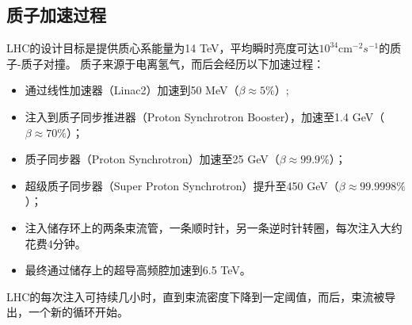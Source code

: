 \subsection{质子加速过程}
LHC的设计目标是提供质心系能量为14 TeV，平均瞬时亮度可达$10^{34} \text{cm}^{-2}s^{-1}$的质子-质子对撞。
质子来源于电离氢气，而后会经历以下加速过程：
\begin{itemize}
  \item 通过线性加速器（Linac2）加速到50 MeV（$\beta\approx5\%$）;
  \item 注入到质子同步推进器（Proton Synchrotron Booster），加速至1.4 GeV（$\beta\approx70\%$）；
  \item 质子同步器（Proton Synchrotron）加速至25 GeV（$\beta\approx99.9\%$）；
  \item 超级质子同步器（Super Proton Synchrotron）提升至450 GeV（$\beta\approx99.9998\%$）；
  \item 注入储存环上的两条束流管，一条顺时针，另一条逆时针转圈，每次注入大约花费4分钟。
  \item 最终通过储存上的超导高频腔加速到6.5 TeV。
\end{itemize}
LHC的每次注入可持续几小时，直到束流密度下降到一定阈值，而后，束流被导出，一个新的循环开始。

